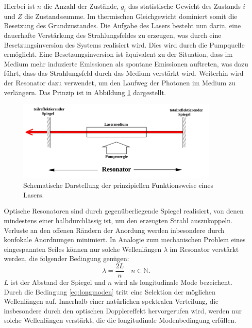 Hierbei ist $n$ die Anzahl der Zustände, $g_{i}$ das statistische Gewicht des Zustands ${i}$
und $Z$ die Zustandssumme. Im thermischen Gleichgewicht dominiert somit die Besetzung
des Grundzustandes. Die Aufgabe des Lasers besteht nun darin,
eine dauerhafte Verstärkung des Strahlungsfeldes zu erzeugen, was durch eine Besetzungsinversion
des Systems realisiert wird. Dies wird durch die Pumpquelle ermöglicht.
Eine Besetzungsinversion ist äquivalent zu der Situation, dass im Medium mehr induzierte
Emissionen als spontane Emissionen auftreten, was dazu führt, dass das Strahlungsfeld durch
das Medium verstärkt wird.
Weiterhin wird der Resonator dazu verwendet, um den Laufweg der Photonen im Medium zu
verlängern. Das Prinzip ist in Abbildung \ref{fig:prinzip_laser} dargestellt.
\begin{figure}
	  \centering
	  \includegraphics[width = 0.9\textwidth]{pictures/funktion.png}
		\caption{Schematische Darstellung der prinzipiellen Funktionsweise eines Lasers.~\cite{Anleitung}}
		\label{fig:prinzip_laser}
\end{figure}

Optische Resonatoren sind durch gegenüberliegende Spiegel realisiert, von denen mindestens einer halbdurchlässig ist, um den erzeugten Strahl
auszukoppeln. Verluste an den offenen Rändern der Anordung werden inbesondere durch konfokale Anordnungen minimiert.
In Analogie zum mechanischen Problem eines eingespannten Seiles können nur solche Wellenlängen $\lambda$
im Resonator verstärkt werden, die
folgender Bedingung genügen:
\begin{equation}
	  \lambda = \frac{2 L }{n} \quad n \in  \mathbb{N}.
	    \label{eq:longmoden}
\end{equation}
$L$ ist der Abstand der Spiegel und $n$ wird als longitudinale Mode bezeichent.
Durch die Bedingung \eqref{eq:longmoden} tritt eine Selektion der möglichen Wellenlängen auf. Innerhalb
einer natürlichen spektralen Verteilung, die insbesondere durch den optischen Dopplereffekt hervorgerufen wird, werden nur solche Wellenlängen
verstärkt, die die longitudinale Modenbedingung erfüllen.


